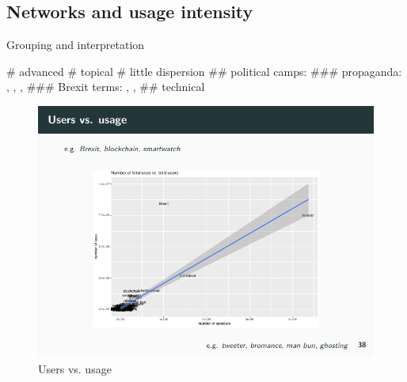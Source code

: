 \documentclass[
  a4paper,
  ]{scrartcl}
\begin{document}
  \subsection{Networks and usage intensity}

    Grouping and interpretation

      \begin{easylist}[itemize]
        # advanced
        # topical
        # little dispersion
          ## political camps:
            ### propaganda: , , , 
            ### Brexit terms: , , 
          ## technical
      \end{easylist}

      \begin{figure}[H]
        \centering
        \includegraphics[width=\linewidth, height=.8\textheight, keepaspectratio]{images/users-vs-usage.pdf}
        \caption{Users vs. usage}
      \end{figure}


  \printbibliography
\end{document}
